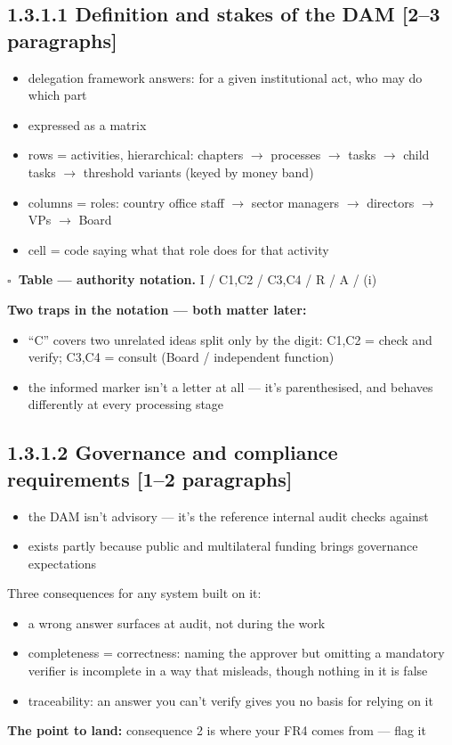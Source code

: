 \documentclass[11pt,a4paper]{article}
\newcommand{\turn}[1]{\par\vspace{3pt}\noindent\textbf{The point to land:} #1\par}
\newcommand{\len}[1]{\hfill\textcolor{gr}{\small[#1]}}
\newcommand{\todo}{$\square$~}
\begin{document}
\subsection*{1.3.1.1 Definition and stakes of the DAM \len{2--3 paragraphs}}
\begin{itemize}
\item delegation framework answers: for a given institutional act, who may do which part
\item expressed as a matrix
\item rows = activities, hierarchical: chapters $\rightarrow$ processes $\rightarrow$ tasks
$\rightarrow$ child tasks $\rightarrow$ threshold variants (keyed by money band)
\item columns = roles: country office staff $\rightarrow$ sector managers $\rightarrow$
directors $\rightarrow$ VPs $\rightarrow$ Board
\item cell = code saying what that role does for that activity
\end{itemize}

\textbf{\todo Table --- authority notation.} I / C1,C2 / C3,C4 / R / A / (i)

\textbf{Two traps in the notation --- both matter later:}
\begin{itemize}
\item ``C'' covers two unrelated ideas split only by the digit:
C1,C2 = check and verify; C3,C4 = consult (Board / independent function)
\item the informed marker isn't a letter at all --- it's parenthesised, and
behaves differently at every processing stage
\end{itemize}

\subsection*{1.3.1.2 Governance and compliance requirements \len{1--2 paragraphs}}
\begin{itemize}
\item the DAM isn't advisory --- it's the reference internal audit checks against
\item exists partly because public and multilateral funding brings governance expectations
\end{itemize}
Three consequences for any system built on it:
\begin{itemize}
\item[1.] a wrong answer surfaces at audit, not during the work
\item[2.] completeness = correctness: naming the approver but omitting a mandatory
verifier is incomplete in a way that misleads, though nothing in it is false
\item[3.] traceability: an answer you can't verify gives you no basis for relying on it
\end{itemize}
\turn{consequence 2 is where your FR4 comes from --- flag it}
\end{document}
